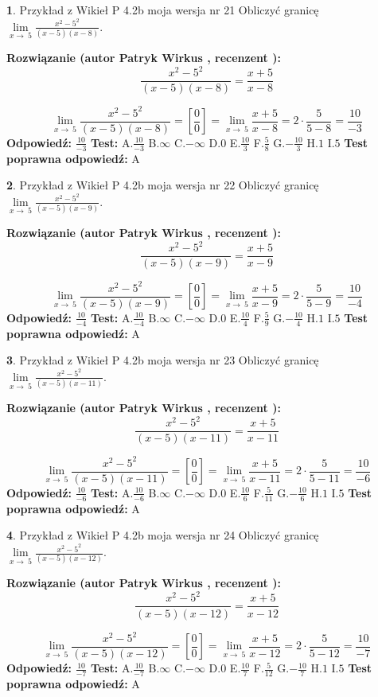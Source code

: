 \documentclass[12pt, a4paper]{article}
\theoremstyle{definition} %
\newtheorem{zad}{}
\newcommand{\zadStart}[1]{\begin{zad}#1\newline}
\newcommand{\zadStop}{\end{zad}}
\newcommand{\rozwStart}[2]{\noindent \textbf{Rozwiązanie (autor #1 , recenzent #2): }\newline}
\newcommand{\rozwStop}{\newline}
\newcommand{\odpStart}{\noindent \textbf{Odpowiedź:}\newline}
\newcommand{\odpStop}{\newline}
\newcommand{\testStart}{\noindent \textbf{Test:}\newline}
\newcommand{\testStop}{\newline}
\newcommand{\kluczStart}{\noindent \textbf{Test poprawna odpowiedź:}\newline}
\newcommand{\kluczStop}{\newline}
\begin{document}
\zadStart{Przykład z Wikieł P 4.2b moja wersja nr 21}
Obliczyć granicę $\lim\limits_{x\to\ 5}\frac{x^{2}-5^{2}}{(x-5)(x-8)}$.
\zadStop
\rozwStart{Patryk Wirkus}{}
$$\frac{x^{2}-5^{2}}{(x-5)(x-8)}=\frac{x+5}{x-8}$$

$$\lim\limits_{x\to\ 5}\frac{x^{2}-5^{2}}{(x-5)(x-8)}=[\frac{0}{0}]=\lim\limits_{x\to\ 5}\frac{x+5}{x-8}=2 \cdot \frac{5}{5-8} = \frac{10}{-3}$$
\rozwStop
\odpStart
$\frac{10}{-3}$
\odpStop
\testStart
A.$\frac{10}{-3}$
B.$\infty$
C.$-\infty$
D.$0$
E.$\frac{10}{3}$
F.$\frac{5}{8}$
G.$-\frac{10}{3}$
H.$1$
I.$5$
\testStop
\kluczStart
A
\kluczStop



\zadStart{Przykład z Wikieł P 4.2b moja wersja nr 22}
Obliczyć granicę $\lim\limits_{x\to\ 5}\frac{x^{2}-5^{2}}{(x-5)(x-9)}$.
\zadStop
\rozwStart{Patryk Wirkus}{}
$$\frac{x^{2}-5^{2}}{(x-5)(x-9)}=\frac{x+5}{x-9}$$

$$\lim\limits_{x\to\ 5}\frac{x^{2}-5^{2}}{(x-5)(x-9)}=[\frac{0}{0}]=\lim\limits_{x\to\ 5}\frac{x+5}{x-9}=2 \cdot \frac{5}{5-9} = \frac{10}{-4}$$
\rozwStop
\odpStart
$\frac{10}{-4}$
\odpStop
\testStart
A.$\frac{10}{-4}$
B.$\infty$
C.$-\infty$
D.$0$
E.$\frac{10}{4}$
F.$\frac{5}{9}$
G.$-\frac{10}{4}$
H.$1$
I.$5$
\testStop
\kluczStart
A
\kluczStop



\zadStart{Przykład z Wikieł P 4.2b moja wersja nr 23}
Obliczyć granicę $\lim\limits_{x\to\ 5}\frac{x^{2}-5^{2}}{(x-5)(x-11)}$.
\zadStop
\rozwStart{Patryk Wirkus}{}
$$\frac{x^{2}-5^{2}}{(x-5)(x-11)}=\frac{x+5}{x-11}$$

$$\lim\limits_{x\to\ 5}\frac{x^{2}-5^{2}}{(x-5)(x-11)}=[\frac{0}{0}]=\lim\limits_{x\to\ 5}\frac{x+5}{x-11}=2 \cdot \frac{5}{5-11} = \frac{10}{-6}$$
\rozwStop
\odpStart
$\frac{10}{-6}$
\odpStop
\testStart
A.$\frac{10}{-6}$
B.$\infty$
C.$-\infty$
D.$0$
E.$\frac{10}{6}$
F.$\frac{5}{11}$
G.$-\frac{10}{6}$
H.$1$
I.$5$
\testStop
\kluczStart
A
\kluczStop



\zadStart{Przykład z Wikieł P 4.2b moja wersja nr 24}
Obliczyć granicę $\lim\limits_{x\to\ 5}\frac{x^{2}-5^{2}}{(x-5)(x-12)}$.
\zadStop
\rozwStart{Patryk Wirkus}{}
$$\frac{x^{2}-5^{2}}{(x-5)(x-12)}=\frac{x+5}{x-12}$$

$$\lim\limits_{x\to\ 5}\frac{x^{2}-5^{2}}{(x-5)(x-12)}=[\frac{0}{0}]=\lim\limits_{x\to\ 5}\frac{x+5}{x-12}=2 \cdot \frac{5}{5-12} = \frac{10}{-7}$$
\rozwStop
\odpStart
$\frac{10}{-7}$
\odpStop
\testStart
A.$\frac{10}{-7}$
B.$\infty$
C.$-\infty$
D.$0$
E.$\frac{10}{7}$
F.$\frac{5}{12}$
G.$-\frac{10}{7}$
H.$1$
I.$5$
\testStop
\kluczStart
A
\kluczStop
\end{document}
